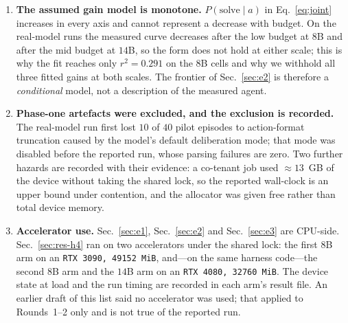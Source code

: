 \documentclass[10pt]{article} %
\begin{document}
\begin{enumerate}
  eight tabular-repair tasks used throughout---so it is a measurement of those two
  pairings and not a general property of language-model agents. The two pairings do
  not agree with each other: the $8$B curve peaks at the low budget and falls, the
  $14$B curve peaks at the mid budget and its paired contrast has more improvements
  than worsenings, and only the $8$B arm defers verification as the budget grows. Two
  sizes are two points, not a scale trend: nothing here separates model size from the
  pairing artefacts, and no third size was run. The tasks are short and
  auto-graded, the hidden suites are fixed, and success is a step function of
  whether the schedule is completed; a longer-horizon task set would move both the
  peak and the point at which behaviour degrades.
\item \textbf{The assumed gain model is monotone.} $P(\text{solve}\mid a)$ in
  Eq.~\eqref{eq:joint} increases in every axis and cannot represent a decrease with
  budget. On the real-model runs the measured curve decreases after the low budget at
  $8$B and after the mid budget at $14$B, so the form does not hold at either scale;
  this is why the fit reaches only $r^2{=}0.291$ on the $8$B cells
  and why we withhold all three fitted gains at both scales. The frontier of
  Sec.~\ref{sec:e2} is
  therefore a \emph{conditional} model, not a description of the measured agent.
\item \textbf{Phase-one artefacts were excluded, and the exclusion is recorded.}
  The real-model run first lost $10$ of $40$ pilot episodes to action-format
  truncation caused by the model's default deliberation mode; that mode was disabled
  before the reported run, whose parsing failures are zero. Two further hazards are
  recorded with their evidence: a co-tenant job used $\approx\!13$~GB of the device
  without taking the shared lock, so the reported wall-clock is an upper bound under
  contention, and the allocator was given free rather than total device memory.
\item \textbf{Accelerator use.} Sec.~\ref{sec:e1}, Sec.~\ref{sec:e2} and
  Sec.~\ref{sec:e3} are CPU-side. Sec.~\ref{sec:res-h4} ran on two accelerators under
  the shared lock: the first $8$B arm on an \texttt{RTX 3090, 49152~MiB}, and---on the
  same harness code---the second $8$B arm and the $14$B arm on an \texttt{RTX 4080,
  32760~MiB}. The device state at load and the run timing are recorded in each arm's
  result file. An earlier draft of this list said no accelerator was used;
  that applied to Rounds~1--2 only and is not true of the reported run.
\end{enumerate}
\end{document}
